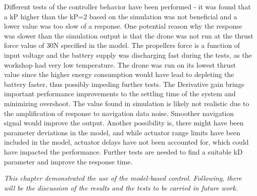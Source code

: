 Different tests of the controller behavior have been performed - it was found that a kP higher than the kP=2 based on the simulation was not beneficial and a lower value was too slow of a response. 
One potential reason why the response was slower than the simulation output is that the drone was not run at the thrust force value of 30N specified in the model. The propellers force is a function of input voltage and the battery supply was discharging fast during the tests, as the workshop had very low temperature. The drone was run on its lowest thrust value since the higher energy consumption would have lead to depleting the battery faster, thus possibly impeding further tests. 
The Derivative gain brings important performance improvements to the settling time of the system and minimizing overshoot. The value found in simulation is likely not realistic due to the amplification of response to navigation data noise. Smoother navigation signal would improve the output. Another possibility is, there might have been parameter deviations in the model, and while actuator range limits have been included in the model, actuator delays have not been accounted for, which could have impacted the performance. Further tests are needed to find a suitable kD parameter and improve the response time. 


\textit{This chapter demonstrated the use of the model-based control. Following, there will be the discussion of the results and the tests to be carried in future work. }

